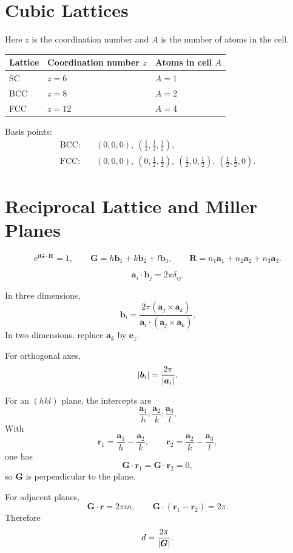 \documentclass[11pt,a4paper]{article}
\newcommand{\ii}{\mathrm{i}}
\newcommand{\ee}{\mathrm{e}}
\newcommand{\vect}[1]{\boldsymbol{#1}}
\begin{document}
\section{Cubic Lattices}

Here $z$ is the coordination number and $A$ is the number of atoms in the cell.

\begin{center}
\begin{tabular}{lll}
\toprule
Lattice & Coordination number $z$ & Atoms in cell $A$ \\
\midrule
SC  & $z=6$  & $A=1$ \\
BCC & $z=8$  & $A=2$ \\
FCC & $z=12$ & $A=4$ \\
\bottomrule
\end{tabular}
\end{center}

Basis points:
\[
\begin{aligned}
\text{BCC:}\quad &(0,0,0),\ \left(\frac12,\frac12,\frac12\right),\\
\text{FCC:}\quad &(0,0,0),\
\left(0,\frac12,\frac12\right),\
\left(\frac12,0,\frac12\right),\
\left(\frac12,\frac12,0\right).
\end{aligned}
\]

\section{Reciprocal Lattice and Miller Planes}

\[
\ee^{\ii \vect G\cdot \vect R}=1,
\qquad
\vect G = h\vect b_1+k\vect b_2+l\vect b_3,
\qquad
\vect R=n_1\vect a_1+n_2\vect a_2+n_3\vect a_3.
\]

\[
\vect a_i\cdot \vect b_j = 2\pi \delta_{ij}.
\]

In three dimensions,
\[
  \vect b_i =
  \frac{2\pi(\vect a_j\times\vect a_k)}
  {\vect a_i\cdot(\vect a_j\times\vect a_k)}.
\]
In two dimensions, replace $\vect a_k$ by $\vect e_z$.

For orthogonal axes,
\[
  \abs{\vect b_i}=\frac{2\pi}{\abs{\vect a_i}}.
\]

For an $(hkl)$ plane, the intercepts are
\[
  \frac{\vect a_1}{h}:\frac{\vect a_2}{k}:\frac{\vect a_3}{l}.
\]
With
\[
  \vect r_1=\frac{\vect a_1}{h}-\frac{\vect a_2}{k},
  \qquad
  \vect r_2=\frac{\vect a_2}{k}-\frac{\vect a_3}{l},
\]
one has
\[
  \vect G\cdot \vect r_1=\vect G\cdot \vect r_2=0,
\]
so $\vect G$ is perpendicular to the plane.

For adjacent planes,
\[
  \vect G\cdot \vect r = 2\pi m,
  \qquad
  \vect G\cdot(\vect r_1-\vect r_2)=2\pi.
\]
Therefore
\[
  d=\frac{2\pi}{\abs{\vect G}}.
\]
\end{document}
